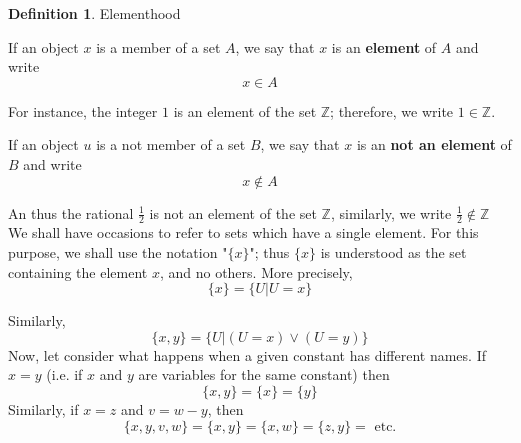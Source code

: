 \documentclass{book}
\theoremstyle{definition}
\newtheorem{definition}{Definition}[section]
\theoremstyle{remark}
\newcommand{\bb}[1]{\mathbb{#1}}
\begin{document}
\begin{definition}
Elementhood  \\

    \begin{tcolorbox}
        If an object $x$ is a member of a set $A$, we say that $x$ is an \textbf{element} of $A$ and write
            \begin{equation*}
                x \in A
            \end{equation*}
    \end{tcolorbox}
    
    For instance, the integer $1$ is an element of the set $\bb{Z}$; therefore, we write $1 \in \bb{Z}$. \\
    
    \begin{tcolorbox}
        If an object $u$ is a not member of a set $B$, we say that $x$ is an \textbf{not an element} of $B$ and write
            \begin{equation*}
                x \notin A
            \end{equation*}
    \end{tcolorbox}
    An thus the rational $\frac{1}{2}$ is not an element of the set $\bb{Z}$, similarly, we write $\frac{1}{2} \notin \bb{Z}$ \\
    
    We shall have occasions to refer to sets which have a single element. For this purpose, we shall use the notation "$\{ x \}$"; thus $\{ x \}$ is understood as the set containing the element $x$, and no others. More precisely, 
        \begin{equation*}
            \{ x \} = \{U | U = x \}    
        \end{equation*}
    
    Similarly, 
        \begin{equation*}
            \{ x,y \} = \{U | (U = x) \vee (U = y) \}             
        \end{equation*}
    Now, let consider what happens when a given constant has different names. If $x=y$ (i.e. if $x$ and $y$ are variables for the same constant) then
        \begin{equation*}
            \{ x,y \} = \{ x \} = \{y \}
        \end{equation*}
    Similarly, if $x=z$ and $v=w-y$, then
        \begin{equation*}
            \{x,y,v,w \} = \{x,y \} = \{x, w \} = \{z,y \} = \text{ etc.}
        \end{equation*}
\end{definition}
\end{document}

